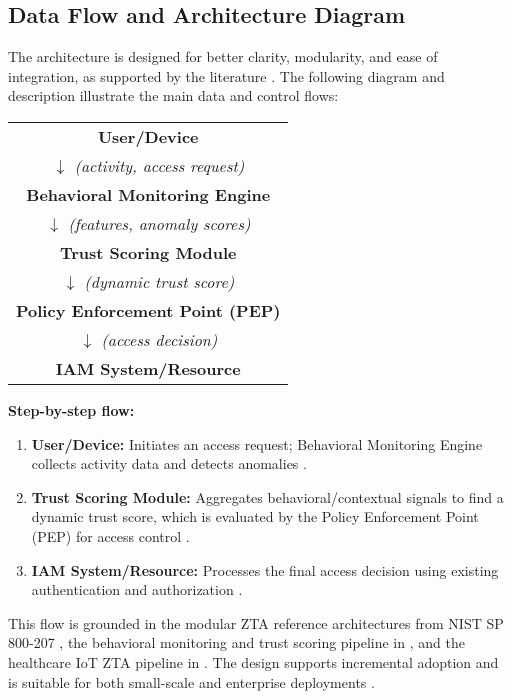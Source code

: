 \documentclass[conference]{IEEEtran}
\begin{document}
\subsection{Data Flow and Architecture Diagram}
The architecture is designed for better clarity, modularity, and ease of integration, as supported by the literature \cite{paper2,paper6,paper12,paper13}. The following diagram and description illustrate the main data and control flows:

\begin{center}
\setlength{\arraycolsep}{1.5em}
\renewcommand{\arraystretch}{1.5}
\begin{tabular}{c}
\textbf{User/Device} \\[-0.5ex]
$\downarrow$ \textit{(activity, access request)} \\[-0.5ex]
\textbf{Behavioral Monitoring Engine} \\[-0.5ex]
$\downarrow$ \textit{(features, anomaly scores)} \\[-0.5ex]
\textbf{Trust Scoring Module} \\[-0.5ex]
$\downarrow$ \textit{(dynamic trust score)} \\[-0.5ex]
\textbf{Policy Enforcement Point (PEP)} \\[-0.5ex]
$\downarrow$ \textit{(access decision)} \\[-0.5ex]
\textbf{IAM System/Resource}
\end{tabular}
\end{center}

\vspace{1ex}

\textbf{Step-by-step flow:}
\begin{enumerate}
    \item \textbf{User/Device:} Initiates an access request; Behavioral Monitoring Engine collects activity data and detects anomalies \cite{paper2,paper6,paper8}.
    \item \textbf{Trust Scoring Module:} Aggregates behavioral/contextual signals to find a dynamic trust score, which is evaluated by the Policy Enforcement Point (PEP) for access control \cite{paper2,paper8,paper12,paper13}.
    \item \textbf{IAM System/Resource:} Processes the final access decision using existing authentication and authorization \cite{paper12}.
\end{enumerate}

This flow is grounded in the modular ZTA reference architectures from NIST SP 800-207 \cite{paper13}, the behavioral monitoring and trust scoring pipeline in \cite{paper2}, and the healthcare IoT ZTA pipeline in \cite{paper6}. The design supports incremental adoption and is suitable for both small-scale and enterprise deployments \cite{paper12}.
\end{document}
